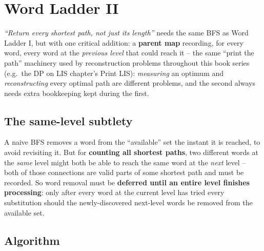 \section{Word Ladder II}
\label{sec:graph-word-ladder-2}


\begin{patternbox}
\emph{``Return every shortest path, not just its length''} needs the
same BFS as Word Ladder I, but with one critical addition: a
\textbf{parent map} recording, for every word, every word at the
\emph{previous level} that could reach it -- the same ``print the
path'' machinery used by reconstruction problems throughout this book
series (e.g.\ the DP on LIS chapter's Print LIS): \emph{measuring} an
optimum and \emph{reconstructing} every optimal path are different
problems, and the second always needs extra bookkeeping kept during
the first.
\end{patternbox}

\subsection*{The same-level subtlety}

A naive BFS removes a word from the ``available'' set the instant it
is reached, to avoid revisiting it. But for \textbf{counting all
shortest paths}, two different words at the \emph{same} level might
both be able to reach the same word at the \emph{next} level -- both
of those connections are valid parts of some shortest path and must be
recorded. So word removal must be \textbf{deferred until an entire
level finishes processing}: only after every word at the current level
has tried every substitution should the newly-discovered next-level
words be removed from the available set.

\subsection*{Algorithm}

